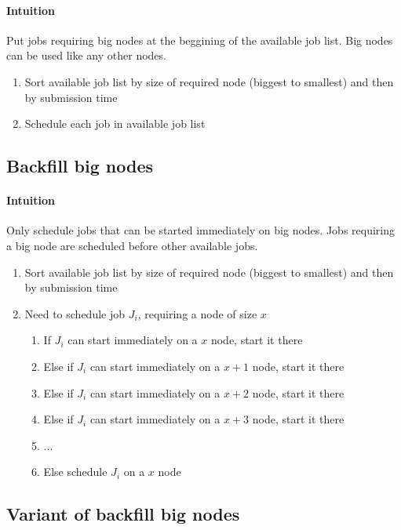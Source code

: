 \documentclass[a4paper]{article}
\begin{document}
\paragraph{Intuition} Put jobs requiring big nodes at the beggining of the available job list.
Big nodes can be used like any other nodes.
\begin{enumerate}
	\item Sort available job list by size of required node (biggest to smallest) and then by submission time
	\item Schedule each job in available job list
\end{enumerate}

\subsection{Backfill big nodes}
\paragraph{Intuition} Only schedule jobs that can be started immediately on big nodes.
Jobs requiring a big node are scheduled before other available jobs.
\begin{enumerate}
	\item Sort available job list by size of required node (biggest to smallest) and then by submission time
	\item Need to schedule job $J_i$, requiring a node of size $x$
	\begin{enumerate}
		\item If $J_i$ can start immediately on a $x$ node, start it there
		\item Else if $J_i$ can start immediately on a $x+1$ node, start it there
		\item Else if $J_i$ can start immediately on a $x+2$ node, start it there
		\item Else if $J_i$ can start immediately on a $x+3$ node, start it there
		\item ...
		\item Else schedule $J_i$ on a $x$ node
	\end{enumerate}
\end{enumerate}

\subsection{Variant of backfill big nodes}
\end{document}
